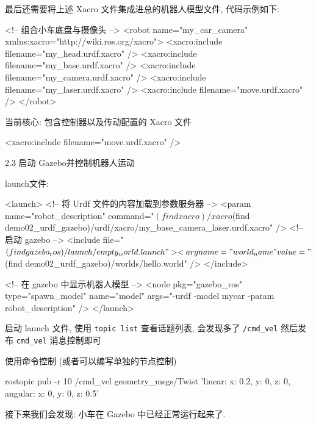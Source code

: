 \documentclass[openany, fontset=windowsold]{ctexbook}
\theoremstyle{kaiti}
\theoremstyle{normal}
\begin{document}
最后还需要将上述 Xacro 文件集成进总的机器人模型文件, 代码示例如下:

\begin{xml}
  <!-- 组合小车底盘与摄像头 -->
  <robot name="my_car_camera" xmlns:xacro="http://wiki.ros.org/xacro">
      <xacro:include filename="my_head.urdf.xacro" />
      <xacro:include filename="my_base.urdf.xacro" />
      <xacro:include filename="my_camera.urdf.xacro" />
      <xacro:include filename="my_laser.urdf.xacro" />
      <xacro:include filename="move.urdf.xacro" />
  </robot>
\end{xml}

当前核心: 包含控制器以及传动配置的 Xacro 文件

\begin{xml}
  <xacro:include filename="move.urdf.xacro" />
\end{xml}

2.3 启动 Gazebo并控制机器人运动

launch文件:

\begin{xml}
  <launch>
      <!-- 将 Urdf 文件的内容加载到参数服务器 -->
      <param name="robot_description" command="$(find xacro)/xacro $(find demo02_urdf_gazebo)/urdf/xacro/my_base_camera_laser.urdf.xacro" />
      <!-- 启动 gazebo -->
      <include file="$(find gazebo_ros)/launch/empty_world.launch">
          <arg name="world_name" value="$(find demo02_urdf_gazebo)/worlds/hello.world" />
      </include>

      <!-- 在 gazebo 中显示机器人模型 -->
      <node pkg="gazebo_ros" type="spawn_model" name="model" args="-urdf -model mycar -param robot_description"  />
  </launch>
\end{xml}

启动 launch 文件, 使用 \verb|topic list| 查看话题列表, 会发现多了 \verb|/cmd_vel| 然后发布 \verb|cmd_vel| 消息控制即可

使用命令控制 (或者可以编写单独的节点控制)

\begin{bash}
  rostopic pub -r 10 /cmd_vel geometry_msgs/Twist '{linear: {x: 0.2, y: 0, z: 0}, angular: {x: 0, y: 0, z: 0.5}}'
\end{bash}

接下来我们会发现: 小车在 Gazebo 中已经正常运行起来了.
\end{document}
